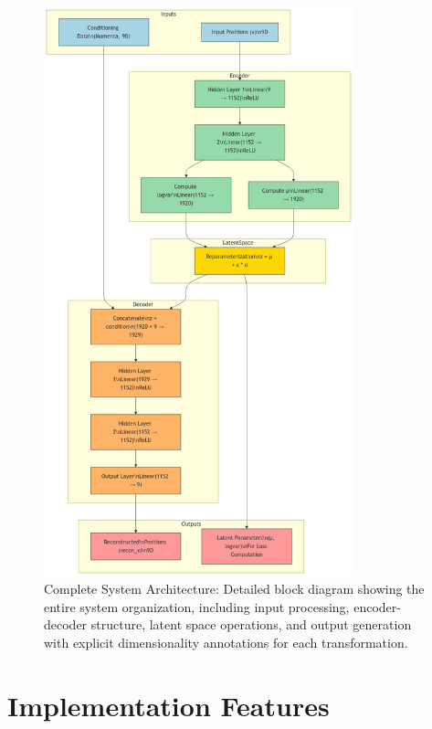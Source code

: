 \documentclass{article}
\begin{document}
\begin{figure}[H]
    \centering
    \includegraphics[width=0.8\textwidth]{4.png}
    \caption{Complete System Architecture: Detailed block diagram showing the entire system organization, including input processing, encoder-decoder structure, latent space operations, and output generation with explicit dimensionality annotations for each transformation.}
    \label{fig:system}
\end{figure}

\section{Implementation Features}
\end{document}

